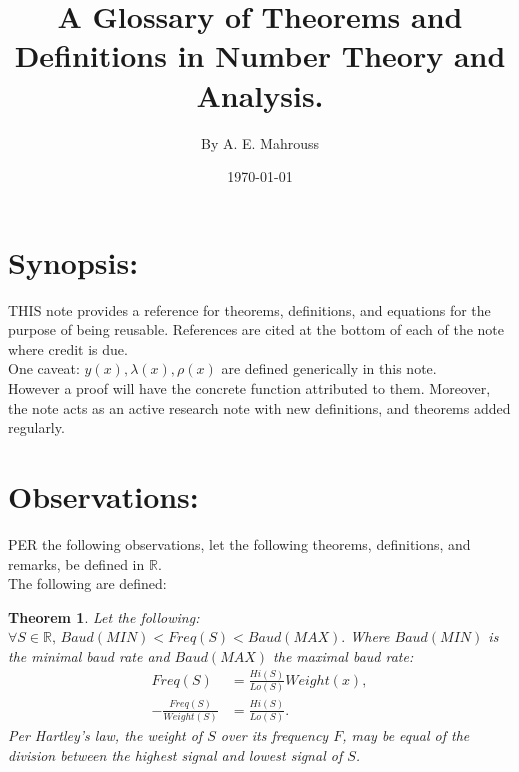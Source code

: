 \documentclass[10pt]{article}
\title{%
	\vspace{-1.5em}%
	\large\textbf{A Glossary of Theorems and Definitions in Number Theory and Analysis.}%
}
\author{By A. E. Mahrouss}
\date{\today}
\theoremstyle{plain}
\newtheorem{theorem}{Theorem}[section]
\theoremstyle{definition}
\theoremstyle{remark}
\begin{document}

\maketitle
\tableofcontents
\newpage

\section{Synopsis:}

\lettrine[lines=2, lhang=0.1, loversize=0.2]{T}HIS note provides a reference for theorems, definitions, and equations for the purpose of being reusable. References are cited at the bottom of each of the note where credit is due.\\
One caveat: $y(x), \lambda(x), \rho(x)$ are defined generically in this note.\\However a proof will have the concrete function attributed to them. Moreover, the note acts as an active research note with new definitions, and theorems added regularly.

\section{Observations:}

\lettrine[lines=1, lhang=0.1, loversize=0.2]{P}ER the following observations, let the following theorems, definitions, and remarks, be defined in $\mathbb{R}.$\\The following are defined:

\begin{theorem}
Let the following:
$\forall S \in \mathbb{R}, \, Baud(MIN) < Freq(S) < Baud(MAX).$ Where $Baud(MIN)$ is the minimal baud rate and $Baud(MAX)$ the maximal baud rate:
\begin{align*}
	Freq(S) &= \frac{Hi(S)}{Lo(S)} Weight(x),\\
	-\frac{Freq(S)}{Weight(S)} &= \frac{Hi(S)}{Lo(S)}.
\end{align*}
Per Hartley's law, the weight of $S$ over its frequency $F$, may be equal of the division between the highest signal and lowest signal of $S$.
\end{theorem}
\end{document}
